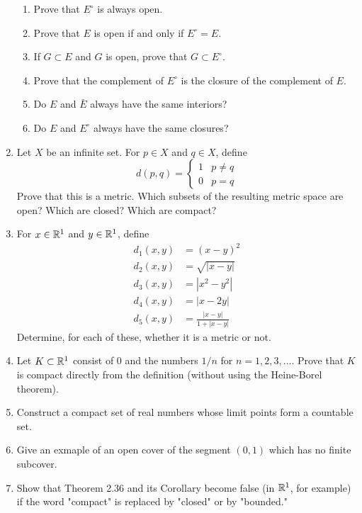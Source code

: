 \documentclass[../psets.tex]{subfiles}
\begin{document}
\begin{enumerate}[label={\textbf{\arabic*.}}]
    \begin{enumerate}
        \item Prove that $E^\circ$ is always open.
        \item Prove that $E$ is open if and only if $E^\circ=E$.
        \item If $G\subset E$ and $G$ is open, prove that $G\subset E^\circ$.
        \item Prove that the complement of $E^\circ$ is the closure of the complement of $E$.
        \item Do $E$ and $\bar{E}$ always have the same interiors?
        \item Do $E$ and $E^\circ$ always have the same closures?
    \end{enumerate}
    \item Let $X$ be an infinite set. For $p\in X$ and $q\in X$, define
    \begin{equation*}
        d(p,q) =
        \begin{cases}
            1 & p\neq q\\
            0 & p=q
        \end{cases}
    \end{equation*}
    Prove that this is a metric. Which subsets of the resulting metric space are open? Which are closed? Which are compact?
    \item For $x\in\mathbb{R}^1$ and $y\in\mathbb{R}^1$, define
    \begin{align*}
        d_1(x,y) &= (x-y)^2\\
        d_2(x,y) &= \sqrt{|x-y|}\\
        d_3(x,y) &= |x^2-y^2|\\
        d_4(x,y) &= |x-2y|\\
        d_5(x,y) &= \frac{|x-y|}{1+|x-y|}
    \end{align*}
    Determine, for each of these, whether it is a metric or not.
    \item Let $K\subset\mathbb{R}^1$ consist of 0 and the numbers $1/n$ for $n=1,2,3,\dots$. Prove that $K$ is compact directly from the definition (without using the Heine-Borel theorem).
    \item Construct a compact set of real numbers whose limit points form a countable set.
    \item Give an exmaple of an open cover of the segment $(0,1)$ which has no finite subcover.
    \item Show that Theorem 2.36 and its Corollary become false (in $\mathbb{R}^1$, for example) if the word "compact" is replaced by "closed" or by "bounded."
\end{enumerate}
\end{document}
